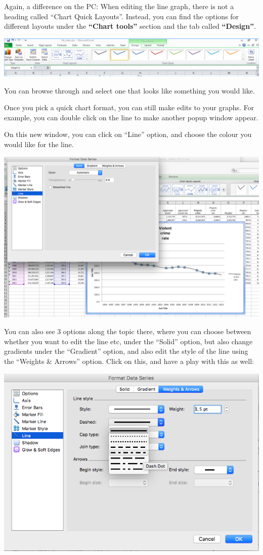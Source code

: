 \documentclass[
]{book}
\begin{document}
Again, a difference on the PC: When editing the line graph, there is not a heading called ``Chart Quick Layouts''. Instead, you can find the options for different layouts under the \textbf{``Chart tools''} section and the tab called \textbf{``Design''}.

\includegraphics{imgs/pc_chart_tools.png}

You can browse through and select one that looks like something you would like.

Once you pick a quick chart format, you can still make edits to your graphs. For example, you can double click on the line to make another popup window appear.

On this new window, you can click on ``Line'' option, and choose the colour you would like for the line.

\includegraphics{imgs/desc_line_edit.png}

You can also see 3 options along the topic there, where you can choose between whether you want to edit the line etc, under the ``Solid'' option, but also change gradients under the ``Gradient'' option, and also edit the style of the line using the ``Weights \& Arrows'' option. Click on this, and have a play with this as well:

\includegraphics{imgs/desc_line_type.png}
\end{document}
